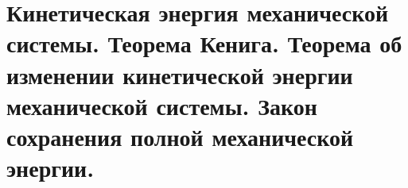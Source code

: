 \chapter{Кинетическая энергия механической системы. Теорема Кенига. Теорема об
изменении кинетической энергии механической системы. Закон сохранения
полной механической энергии.}

\newpage
